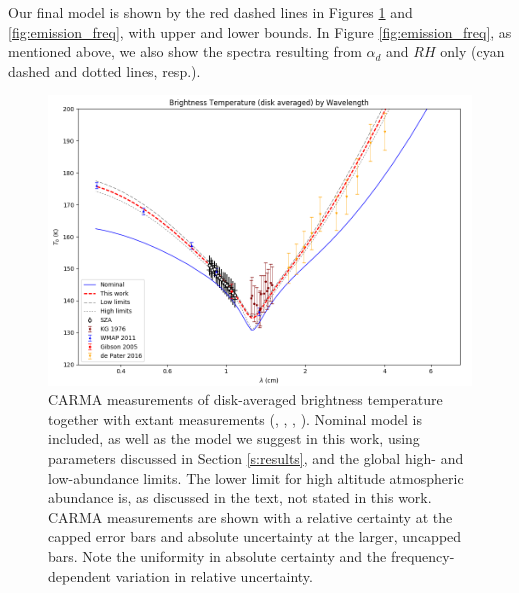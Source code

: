 \documentclass{article}
\begin{document}
	Our final model is shown by the red dashed lines in Figures \ref{fig:emission_wl} and \ref{fig:emission_freq}, with upper and lower bounds.
	In Figure \ref{fig:emission_freq}, as mentioned above, we also show the spectra resulting from $\alpha_{d}$ and $RH$ only (cyan dashed and dotted lines, resp.).

	\begin{figure}
		\centering
		\includegraphics[width=\textwidth]{final_models_wl.png}
		\caption{\label{fig:emission_wl}CARMA measurements of disk-averaged brightness temperature together with extant measurements (\citealt{1978Icar...35...44K}, \citealt{2011ApJS..192...19W}, \citealt{2005Icar..173..439G}, \citealt{2016AGUFM.P31D..08D}). Nominal model is included, as well as the model we suggest in this work, using parameters discussed in Section \ref{s:results}, and the global high- and low-abundance limits. The lower limit for high altitude atmospheric abundance is, as discussed in the text, not stated in this work. CARMA measurements are shown with a relative certainty at the capped error bars and absolute uncertainty at the larger, uncapped bars. Note the uniformity in absolute certainty and the frequency-dependent variation in relative uncertainty.}
	\end{figure}
\end{document}
